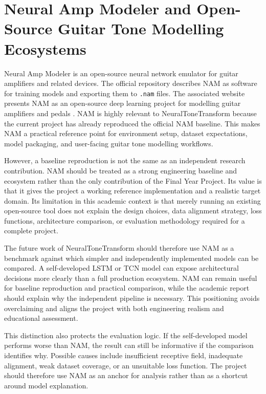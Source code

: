 \documentclass[conference]{IEEEtran}
\begin{document}
\section{Neural Amp Modeler and Open-Source Guitar Tone Modelling Ecosystems}

Neural Amp Modeler is an open-source neural network emulator for guitar amplifiers and related devices. The official repository describes NAM as software for training models and exporting them to \texttt{.nam} files. The associated website presents NAM as an open-source deep learning project for modelling guitar amplifiers and pedals \cite{atkinson_nam}. NAM is highly relevant to NeuralToneTransform because the current project has already reproduced the official NAM baseline. This makes NAM a practical reference point for environment setup, dataset expectations, model packaging, and user-facing guitar tone modelling workflows.

However, a baseline reproduction is not the same as an independent research contribution. NAM should be treated as a strong engineering baseline and ecosystem rather than the only contribution of the Final Year Project. Its value is that it gives the project a working reference implementation and a realistic target domain. Its limitation in this academic context is that merely running an existing open-source tool does not explain the design choices, data alignment strategy, loss functions, architecture comparison, or evaluation methodology required for a complete project.

The future work of NeuralToneTransform should therefore use NAM as a benchmark against which simpler and independently implemented models can be compared. A self-developed LSTM or TCN model can expose architectural decisions more clearly than a full production ecosystem. NAM can remain useful for baseline reproduction and practical comparison, while the academic report should explain why the independent pipeline is necessary. This positioning avoids overclaiming and aligns the project with both engineering realism and educational assessment.

This distinction also protects the evaluation logic. If the self-developed model performs worse than NAM, the result can still be informative if the comparison identifies why. Possible causes include insufficient receptive field, inadequate alignment, weak dataset coverage, or an unsuitable loss function. The project should therefore use NAM as an anchor for analysis rather than as a shortcut around model explanation.
\end{document}
